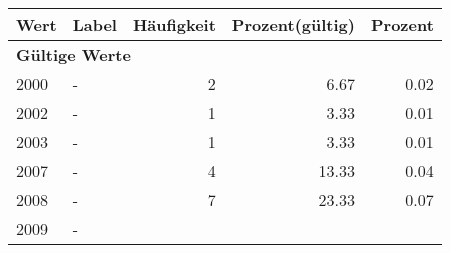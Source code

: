      \begin{longtable}{lXrrr}
     \toprule
     \textbf{Wert} & \textbf{Label} & \textbf{Häufigkeit} & \textbf{Prozent(gültig)} & \textbf{Prozent} \\
     \endhead
     \midrule
     \multicolumn{5}{l}{\textbf{Gültige Werte}}\\

     2000 &
     \multicolumn{1}{X}{ -  } &


       \num{2} &
       \num[round-mode=places,round-precision=2]{6.67} &
         \num[round-mode=places,round-precision=2]{0.02} \\

     2002 &
     \multicolumn{1}{X}{ -  } &


       \num{1} &
       \num[round-mode=places,round-precision=2]{3.33} &
         \num[round-mode=places,round-precision=2]{0.01} \\

     2003 &
     \multicolumn{1}{X}{ -  } &


       \num{1} &
       \num[round-mode=places,round-precision=2]{3.33} &
         \num[round-mode=places,round-precision=2]{0.01} \\

     2007 &
     \multicolumn{1}{X}{ -  } &


       \num{4} &
       \num[round-mode=places,round-precision=2]{13.33} &
         \num[round-mode=places,round-precision=2]{0.04} \\

     2008 &
     \multicolumn{1}{X}{ -  } &


       \num{7} &
       \num[round-mode=places,round-precision=2]{23.33} &
         \num[round-mode=places,round-precision=2]{0.07} \\

     2009 &
     \multicolumn{1}{X}{ -  } &



\end{longtable}
